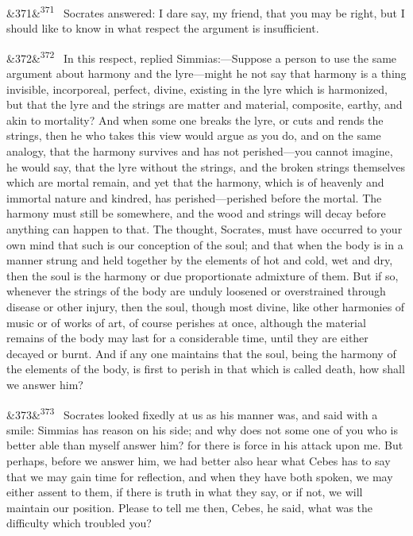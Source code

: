 \documentclass[12pt]{article}
\newcommand{\para}[1][]{\par\noindent\ifx&#1&\else\textsuperscript{\footnotesize #1}~\fi}
\begin{document}
\para[371] Socrates answered: I dare say, my friend, that you may be right, but I should like to know in what respect the argument is insufficient.

\para[372] In this respect, replied Simmias:---Suppose a person to use the same argument about harmony and the lyre---might he not say that harmony is a thing invisible, incorporeal, perfect, divine, existing in the lyre which is harmonized, but that the lyre and the strings are matter and material, composite, earthy, and akin to mortality? And when some one breaks the lyre, or cuts and rends the strings, then he who takes this view would argue as you do, and on the same analogy, that the harmony survives and has not perished---you cannot imagine, he would say, that the lyre without the strings, and the broken strings themselves which are mortal remain, and yet that the harmony, which is of heavenly and immortal nature and kindred, has perished---perished before the mortal. The harmony must still be somewhere, and the wood and strings will decay before anything can happen to that. The thought, Socrates, must have occurred to your own mind that such is our conception of the soul; and that when the body is in a manner strung and held together by the elements of hot and cold, wet and dry, then the soul is the harmony or due proportionate admixture of them. But if so, whenever the strings of the body are unduly loosened or overstrained through disease or other injury, then the soul, though most divine, like other harmonies of music or of works of art, of course perishes at once, although the material remains of the body may last for a considerable time, until they are either decayed or burnt. And if any one maintains that the soul, being the harmony of the elements of the body, is first to perish in that which is called death, how shall we answer him?

\para[373] Socrates looked fixedly at us as his manner was, and said with a smile: Simmias has reason on his side; and why does not some one of you who is better able than myself answer him? for there is force in his attack upon me. But perhaps, before we answer him, we had better also hear what Cebes has to say that we may gain time for reflection, and when they have both spoken, we may either assent to them, if there is truth in what they say, or if not, we will maintain our position. Please to tell me then, Cebes, he said, what was the difficulty which troubled you?
\end{document}
